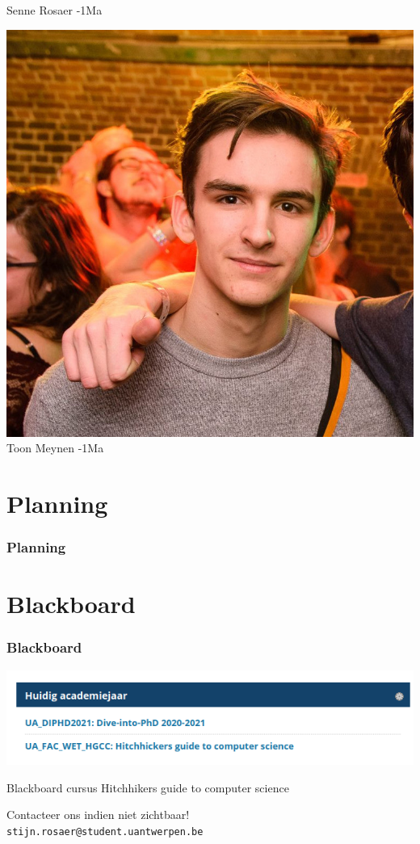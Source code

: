 \begin{frame}
\begin{minipage}{0.30\linewidth}
        \footnotesize Senne Rosaer -1Ma\strut%
    \end{minipage}
    \begin{minipage}{0.30\linewidth}%
		\centering%
		\includegraphics[width=\linewidth]{res/toon} \\%
		\footnotesize Toon Meynen -1Ma\strut%
    \end{minipage}
\end{frame}  

\section{Planning}
\addtocounter{minutes}{3}
\begin{frame}
	\frametitle{Planning}
    

\end{frame}

\section{Blackboard}
\begin{frame}
    \frametitle{Blackboard}
    \includegraphics[scale=0.5]{res/bb.png}    

	
	Blackboard cursus Hitchhikers guide to computer science
	\vspace{1cm}

	Contacteer ons indien niet zichtbaar!\\
	\texttt{stijn.rosaer@student.uantwerpen.be}
\end{frame}

